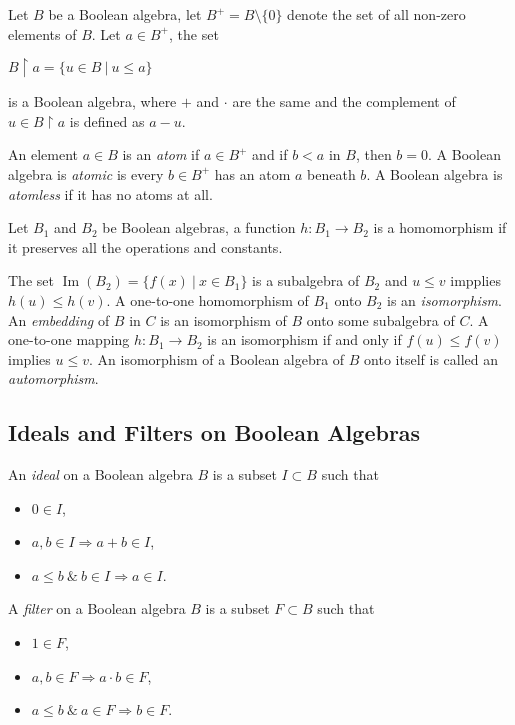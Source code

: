 \documentclass[8pt]{article}
\theoremstyle{definition}
\theoremstyle{definition}
\theoremstyle{definition}
\theoremstyle{definition}
\theoremstyle{definition}
\theoremstyle{definition}
\theoremstyle{definition}
\theoremstyle{definition}
\theoremstyle{definition}
\theoremstyle{definition}
\theoremstyle{definition}
\theoremstyle{definition}
\theoremstyle{definition}
\theoremstyle{definition}
\theoremstyle{question}
\begin{document}
Let $B$ be a Boolean algebra, let $B^+ = B \setminus \{ 0 \}$ denote the set of all non-zero elements of $B$.
Let $a \in B^+$, the set
\begin{center}
  $B \upharpoonright a = \{ u \in B \: | \: u \leq a \}$
\end{center}
is a Boolean algebra, where $+$ and $\cdot$ are the same and the complement of $u \in B \upharpoonright a$ is defined as 
$a - u$.

An element $a \in B$ is an \emph{atom} if $a \in B^{+}$ and if $b < a$ in $B$, then $b = 0$. A Boolean algebra
is \emph{atomic} is every $b \in B^{+}$ has an atom $a$ beneath $b$. 
A Boolean algebra is \emph{atomless} if it has no atoms at all.

Let $B_1$ and $B_2$ be Boolean algebras, a function $h : B_1 \to B_2$ is a homomorphism if it preserves all the operations
and constants.

The set $\operatorname{Im}(B_2) = \{ f(x) \: | \: x \in B_1 \}$ is a subalgebra of $B_2$ and $u \leq v$ impplies
$h(u) \leq h(v)$. A one-to-one homomorphism of $B_1$ onto $B_2$ is an \emph{isomorphism}. 
An \emph{embedding} of $B$ in $C$ is an isomorphism of $B$ onto some subalgebra of $C$.
A one-to-one mapping $h : B_1 \to B_2$ is an isomorphism if and only if
$f(u) \leq f(v)$ implies $u \leq v$.
An isomorphism of a Boolean algebra of $B$ onto itself is called an \emph{automorphism}.

\subsection{Ideals and Filters on Boolean Algebras}

An \emph{ideal} on a Boolean algebra $B$ is a subset $I \subset B$ such that
\begin{itemize}
  \item $0 \in I$,
  \item $a, b \in I \Rightarrow a + b \in I$,
  \item $a \leq b \: \& \: b \in I \Rightarrow a \in I$.
\end{itemize}

A \emph{filter} on a Boolean algebra $B$ is a subset $F \subset B$ such that
\begin{itemize}
  \item $1 \in F$,
  \item $a, b \in F \Rightarrow a \cdot b \in F$,
  \item $a \leq b \: \& \: a \in F \Rightarrow b \in F$.
\end{itemize}
\end{document}
